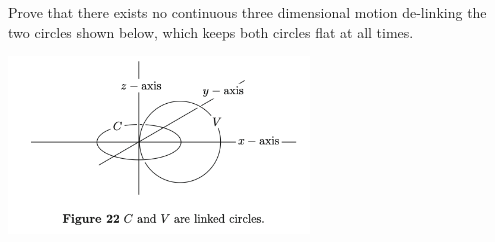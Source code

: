 \documentclass[a4paper, 11pt]{article}
\begin{document}
\begin{problem} [1.49*]
Prove that there exists no continuous three dimensional motion de-linking the two circles shown below, which keeps both circles flat at all times.
\begin{center}
    \includegraphics[width = 8cm]{figures/figure22.png}
\end{center}
\end{problem}
\end{document}
